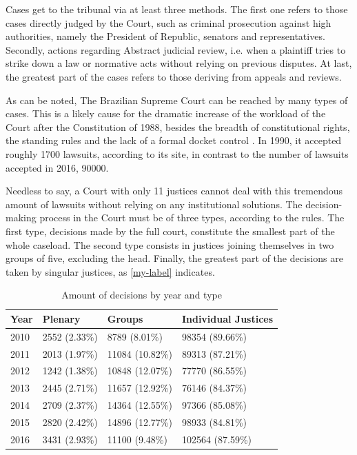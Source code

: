 \documentclass[12pt, a4paper]{article}
\begin{document}
Cases get to the tribunal via at least three methods. The first one refers to those cases directly judged by the Court, such as criminal prosecution against high authorities, namely the President of Republic, senators and representatives. Secondly, actions regarding Abstract judicial review, i.e. when a plaintiff tries to strike down a law or normative acts
without relying on previous disputes. At last, the greatest
part of the cases refers to those deriving
from appeals and reviews.

As can be noted, The Brazilian Supreme Court can be reached by many types of cases. This is a likely cause for the dramatic increase of the workload of the Court after the Constitution of 1988, besides the breadth of constitutional rights, the standing rules and the lack of a formal docket control \citep{rios2006institutional, verissimo2008constituiccao}. In 1990, it accepted roughly 1700 lawsuits, according to its site, in contrast to the number of lawsuits accepted in 2016, 90000. 

Needless to say, a Court with only 11 justices cannot deal with this tremendous amount of lawsuits without relying on any institutional solutions. The decision-making process in the Court must be of three types, according to the rules. The first type, decisions made by the full court, constitute the smallest part of the whole caseload.  The second type consists in justices  joining themselves in two groups of five, excluding the head. Finally, the greatest part of the decisions are taken by singular justices, as \autoref{my-label} indicates.

\begin{table}[htb]
\centering
\caption{Amount of decisions by year and type}
\label{my-label}
\begin{tabular}{llll}
\hline\hline 
Year & Plenary    & Groups          & Individual Justices  \\
\hline
2010 & 2552 (2.33\%) & 8789 (8.01\%)   & 98354 (89.66\%)  \\
2011 & 2013 (1.97\%) & 11084 (10.82\%) & 89313 (87.21\%)  \\
2012 & 1242 (1.38\%) & 10848 (12.07\%) & 77770 (86.55\%)  \\
2013 & 2445 (2.71\%) & 11657 (12.92\%) & 76146 (84.37\%)  \\
2014 & 2709 (2.37\%) & 14364 (12.55\%) & 97366 (85.08\%)  \\
2015 & 2820 (2.42\%) & 14896 (12.77\%) & 98933 (84.81\%)  \\
2016 & 3431 (2.93\%) & 11100 (9.48\%)  & 102564 (87.59\%)
\end{tabular}
\end{table}
\end{document}
